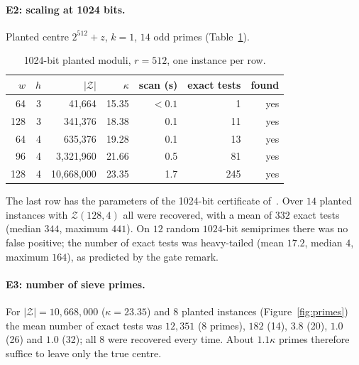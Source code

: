 \documentclass[11pt,a4paper]{article}
\begin{document}
\paragraph{E2: scaling at 1024 bits.} Planted centre $2^{512}+z$, $k=1$, $14$ odd primes (Table~\ref{tab:scaling}).
\begin{table}[ht]\centering\small
\caption{1024-bit planted moduli, $r=512$, one instance per row.}\label{tab:scaling}
\begin{tabular}{@{}rrrrrrr@{}}\toprule
$w$ & $h$ & $|\mathcal Z|$ & $\kappa$ & scan (s) & exact tests & found\\\midrule
64 & 3 & 41,664 & 15.35 & $<0.1$ & 1 & yes\\
128 & 3 & 341,376 & 18.38 & 0.1 & 11 & yes\\
64 & 4 & 635,376 & 19.28 & 0.1 & 13 & yes\\
96 & 4 & 3,321,960 & 21.66 & 0.5 & 81 & yes\\
128 & 4 & 10,668,000 & 23.35 & 1.7 & 245 & yes\\\bottomrule
\end{tabular}
\end{table}
The last row has the parameters of the 1024-bit certificate of~\cite{zenodo10}. Over $14$ planted instances with $\mathcal Z(128,4)$ all were recovered, with a mean of $332$ exact tests (median $344$, maximum $441$). On $12$ random $1024$-bit semiprimes there was no false positive; the number of exact tests was heavy-tailed (mean $17.2$, median $4$, maximum $164$), as predicted by the gate remark.

\paragraph{E3: number of sieve primes.} For $|\mathcal Z|=10{,}668{,}000$ ($\kappa=23.35$) and $8$ planted instances (Figure~\ref{fig:primes}) the mean number of exact tests was $12{,}351$ (8 primes), $182$ (14), $3.8$ (20), $1.0$ (26) and $1.0$ (32); all $8$ were recovered every time. About $1.1\kappa$ primes therefore suffice to leave only the true centre.
\end{document}
